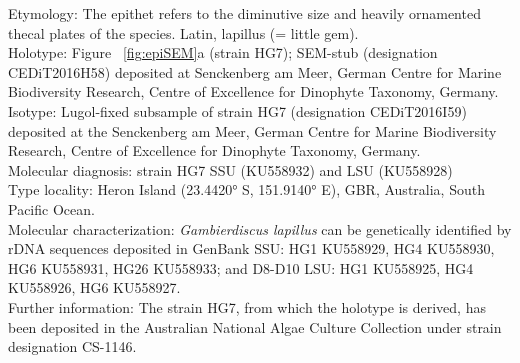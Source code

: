 \documentclass[12pt]{article}
\begin{document}
Etymology: The epithet refers to the diminutive size and heavily ornamented thecal plates of the species. Latin, lapillus (= little gem). \\
Holotype: Figure ~\ref{fig:epiSEM}a (strain HG7); SEM-stub (designation CEDiT2016H58) deposited at Senckenberg am Meer, German Centre for Marine Biodiversity Research, Centre of Excellence for Dinophyte Taxonomy, Germany. \\
Isotype: Lugol-fixed subsample of strain HG7 (designation CEDiT2016I59) deposited at the Senckenberg am Meer, German Centre for Marine Biodiversity Research, Centre of Excellence for Dinophyte Taxonomy, Germany. \\
Molecular diagnosis: strain HG7 SSU (KU558932) and LSU (KU558928)\\
Type locality: Heron Island (23.4420° S, 151.9140° E), GBR, Australia, South Pacific Ocean.\\
Molecular characterization: \textit{Gambierdiscus lapillus} can be genetically identified by rDNA sequences deposited in GenBank SSU: HG1 KU558929, HG4 KU558930, HG6 KU558931, HG26 KU558933; and D8-D10 LSU: HG1 KU558925, HG4 KU558926, HG6 KU558927. \\
Further information: The strain HG7, from which the holotype is derived, has been deposited in the Australian National Algae Culture Collection under strain designation CS-1146.
\end{document}
